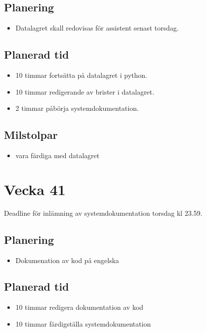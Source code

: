 \documentclass{TDP003mall}
\begin{document}
\subsection{Planering}
\begin{itemize}
\item Datalagret skall redovisas för assistent senast torsdag.
\end{itemize}

\subsection{Planerad tid}
\begin{itemize}
\item 10 timmar fortsätta på datalagret i python.
\item 10 timmar redigerande av brister i datalagret.
\item 2 timmar påbörja systemdokumentation.
\end{itemize}

\subsection{Milstolpar}
\begin{itemize}
\item vara färdiga med datalagret
\end{itemize}

\section{Vecka 41}
Deadline för inlämning av systemdokumentation torsdag kl 23.59.\\

\subsection{Planering}
\begin{itemize}
\item Dokumenation av kod på engelska
\end{itemize}

\subsection{Planerad tid}
\begin{itemize}
\item 10 timmar redigera dokumentation av kod 
\item 10 timmar färdigställa systemdokumentation 
\end{itemize}
\end{document}
